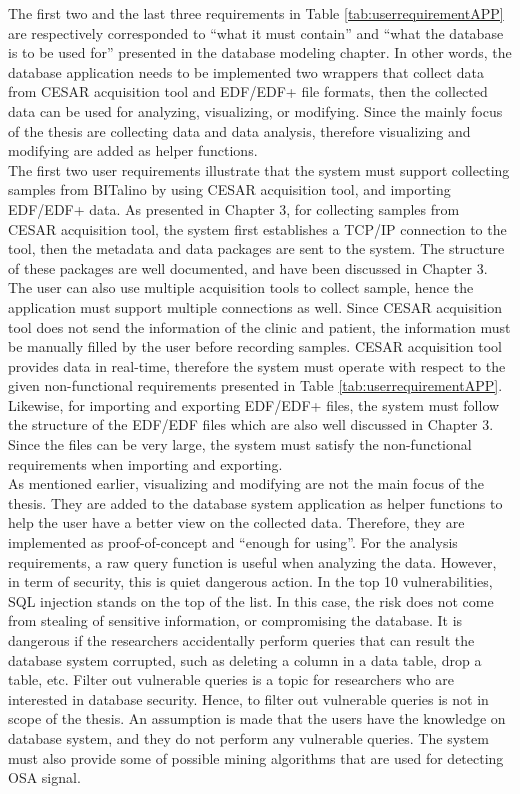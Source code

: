 The first two and the last three requirements in Table \ref{tab:userrequirementAPP} are respectively corresponded to “what it must contain” and “what the database is to be used for” presented in the database modeling chapter. In other words, the database application needs to be implemented two wrappers that collect data from CESAR acquisition tool and EDF/EDF+ file formats, then the collected data can be used for analyzing, visualizing, or modifying. Since the mainly focus of the thesis are collecting data and data analysis, therefore visualizing and modifying are added as helper functions.\\
The first two user requirements illustrate that the system must support collecting samples from BITalino by using CESAR acquisition tool, and importing EDF/EDF+ data. As presented in Chapter 3, for collecting samples from CESAR acquisition tool, the system first establishes a TCP/IP connection to the tool, then the metadata and data packages are sent to the system. The structure of these packages are well documented, and have been discussed in Chapter 3. The user can also use multiple acquisition tools to collect sample, hence the application must support multiple connections as well. Since CESAR acquisition tool does not send the information of the clinic and patient, the information must be manually filled by the user before recording samples. CESAR acquisition tool provides data in real-time, therefore the system must operate with respect to the given non-functional requirements presented in Table \ref{tab:userrequirementAPP}. Likewise, for importing and exporting EDF/EDF+ files, the system must follow the structure of the EDF/EDF files which are also well discussed in Chapter 3. Since the files can be very large, the system must satisfy the non-functional requirements when importing and exporting.\\
As mentioned earlier, visualizing and modifying are not the main focus of the thesis. They are added to the database system application as helper functions to help the user have a better view on the collected data. Therefore, they are implemented as proof-of-concept and “enough for using”. For the analysis requirements, a raw query function is useful when analyzing the data. However, in term of security, this is quiet dangerous action. In the top 10 vulnerabilities, SQL injection stands on the top of the list\cite{OWASP}. In this case, the risk does not come from stealing of sensitive information, or compromising the database. It is dangerous if the researchers accidentally perform queries that can result the database system corrupted, such as deleting a column in a data table, drop a table, etc. Filter out vulnerable queries is a topic for researchers who are interested in database security. Hence, to filter out vulnerable queries is not in scope of the thesis. An assumption is made that the users have the knowledge on database system, and they do not perform any vulnerable queries. The system must also provide some of possible mining algorithms that are used for detecting OSA signal.
